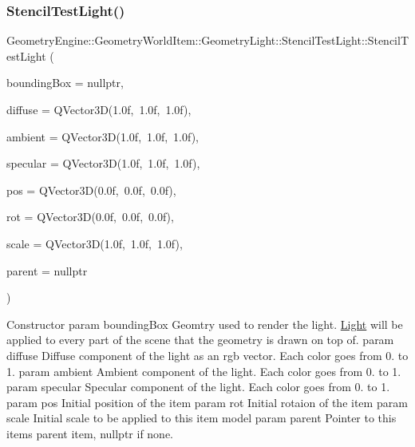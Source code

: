 \subsubsection{\texorpdfstring{StencilTestLight()}{StencilTestLight()}\hspace{0.1cm}{\footnotesize\ttfamily [1/2]}}
{\footnotesize\ttfamily Geometry\+Engine\+::\+Geometry\+World\+Item\+::\+Geometry\+Light\+::\+Stencil\+Test\+Light\+::\+Stencil\+Test\+Light (\begin{DoxyParamCaption}\item[{\mbox{\hyperlink{class_geometry_engine_1_1_geometry_world_item_1_1_geometry_item_1_1_geometry_item}{Geometry\+Item\+::\+Geometry\+Item}} $\ast$}]{bounding\+Box = {\ttfamily nullptr},  }\item[{const Q\+Vector3D \&}]{diffuse = {\ttfamily QVector3D(1.0f,~1.0f,~1.0f)},  }\item[{const Q\+Vector3D \&}]{ambient = {\ttfamily QVector3D(1.0f,~1.0f,~1.0f)},  }\item[{const Q\+Vector3D \&}]{specular = {\ttfamily QVector3D(1.0f,~1.0f,~1.0f)},  }\item[{const Q\+Vector3D \&}]{pos = {\ttfamily QVector3D(0.0f,~0.0f,~0.0f)},  }\item[{const Q\+Vector3D \&}]{rot = {\ttfamily QVector3D(0.0f,~0.0f,~0.0f)},  }\item[{const Q\+Vector3D \&}]{scale = {\ttfamily QVector3D(1.0f,~1.0f,~1.0f)},  }\item[{\mbox{\hyperlink{class_geometry_engine_1_1_geometry_world_item_1_1_world_item}{World\+Item}} $\ast$}]{parent = {\ttfamily nullptr} }\end{DoxyParamCaption})}

Constructor param bounding\+Box Geomtry used to render the light. \mbox{\hyperlink{class_geometry_engine_1_1_geometry_world_item_1_1_geometry_light_1_1_light}{Light}} will be applied to every part of the scene that the geometry is drawn on top of. param diffuse Diffuse component of the light as an rgb vector. Each color goes from 0. to 1. param ambient Ambient component of the light. Each color goes from 0. to 1. param specular Specular component of the light. Each color goes from 0. to 1. param pos Initial position of the item param rot Initial rotaion of the item param scale Initial scale to be applied to this item model param parent Pointer to this items parent item, nullptr if none. \mbox{\label{class_geometry_engine_1_1_geometry_world_item_1_1_geometry_light_1_1_stencil_test_light_a790e1319f7b03e4b2fb51352b7fe370e}} 
